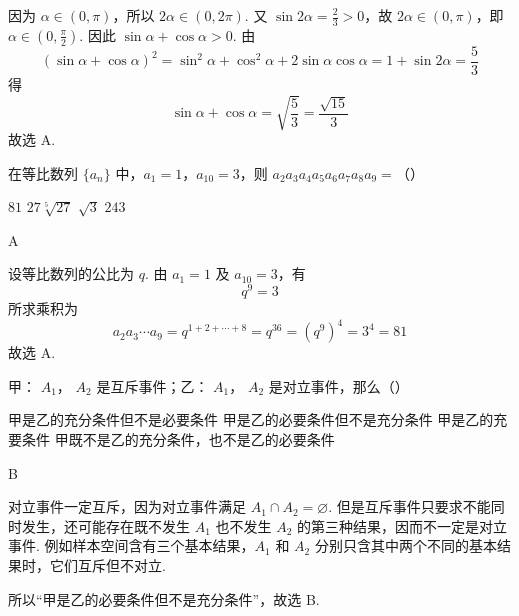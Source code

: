 \begin{solution}
因为 \(\alpha\in(0,\pi)\)，所以 \(2\alpha\in(0,2\pi)\). 又 \(\sin 2\alpha=\frac23>0\)，故 \(2\alpha\in(0,\pi)\)，即 \(\alpha\in(0,\frac\pi2)\). 因此 \(\sin\alpha+\cos\alpha>0\). 由
\[
(\sin\alpha+\cos\alpha)^2
=\sin^2\alpha+\cos^2\alpha+2\sin\alpha\cos\alpha
=1+\sin 2\alpha
=\frac53
\]
得
\[
\sin\alpha+\cos\alpha=\sqrt{\frac53}=\frac{\sqrt{15}}{3}
\]
故选 A.
\end{solution}

\begin{problem}
在等比数列 \(\{a_{n}\}\) 中，\(a_{1} = 1\)，\(a_{10} = 3\)，则 \(a_{2}a_{3}a_{4}a_{5}a_{6}a_{7}a_{8}a_{9} =\)（\quad）

\choices
    {\(81\)}
    {\(27\sqrt[5]{27}\)}
    {\(\sqrt{3}\)}
    {\(243\)}
\end{problem}

\begin{answer}
A
\end{answer}

\begin{solution}
设等比数列的公比为 \(q\). 由 \(a_1=1\) 及 \(a_{10}=3\)，有
\[
q^9=3
\]
所求乘积为
\[
a_2a_3\cdots a_9
=q^{1+2+\cdots+8}
=q^{36}
=(q^9)^4
=3^4=81
\]
故选 A.
\end{solution}

\begin{problem}
甲： \(A_{1}\)， \(A_{2}\) 是互斥事件；乙： \(A_{1}\)， \(A_{2}\) 是对立事件，那么（\quad）

\choices
    {甲是乙的充分条件但不是必要条件}
    {甲是乙的必要条件但不是充分条件}
    {甲是乙的充要条件}
    {甲既不是乙的充分条件，也不是乙的必要条件}
\end{problem}

\begin{answer}
B
\end{answer}

\begin{solution}
对立事件一定互斥，因为对立事件满足 \(A_1\cap A_2=\varnothing\). 但是互斥事件只要求不能同时发生，还可能存在既不发生 \(A_1\) 也不发生 \(A_2\) 的第三种结果，因而不一定是对立事件. 例如样本空间含有三个基本结果，\(A_1\) 和 \(A_2\) 分别只含其中两个不同的基本结果时，它们互斥但不对立.

所以“甲是乙的必要条件但不是充分条件”，故选 B.
\end{solution}

